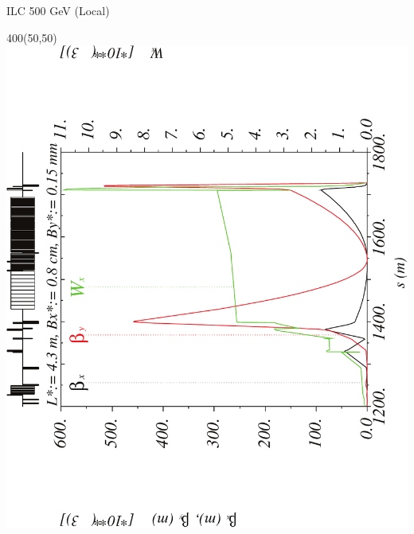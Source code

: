 \documentclass{beamer}
\begin{document}
\begin{frame}{ILC 500 GeV (Local)}
  \setlength{\TPHorizModule}{1pt}
  \setlength{\TPVertModule}{1pt}
 \begin{textblock}{400}(50,50)
 \includegraphics[scale=0.4,angle=-90]{ILClocal_wx-crop.pdf}
 \end{textblock}
\end{frame}
\end{document}

